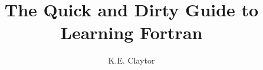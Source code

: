 \documentclass{article}
\title{The Quick and Dirty Guide to Learning Fortran}
\author{K.E. Claytor}
\begin{document}
\maketitle

\pagebreak
\tableofcontents
\pagebreak

\pagebreak

\pagebreak

\pagebreak


\appendix
\end{document}
